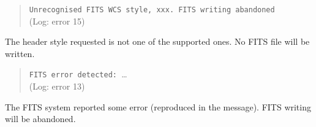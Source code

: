\documentclass[twoside,11pt]{article}
\renewcommand{\_}{\texttt{\symbol{95}}}
\begin{document}
\begin{quote}
\texttt{Unrecognised FITS WCS style, xxx.  FITS writing abandoned}\\
(Log: error 15)
\end{quote}
The header style requested is not one of the supported ones.  No FITS
file will be written.

\begin{quote}
\texttt{FITS error detected: }\dots\\
(Log: error 13)
\end{quote}
The FITS system reported some error (reproduced in the message).  FITS
writing will be abandoned.
\end{document}
